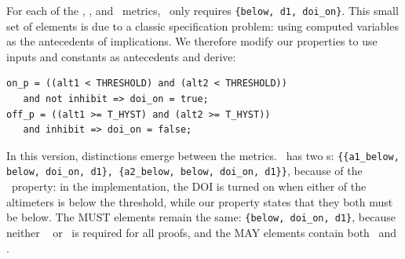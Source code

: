 \noindent %
For each of the \ivccov, \maycov, and \mustcov\ metrics, {\small \allp} ~only requires {\small \texttt{\{below, d1, doi\_on\}}}. %
This small set of elements is due to a classic specification problem: using computed variables as the antecedents of implications.  %
%
%
We therefore modify our properties to use inputs and constants as antecedents and derive:

{\smaller
\begin{verbatim}
on_p = ((alt1 < THRESHOLD) and (alt2 < THRESHOLD))
   and not inhibit => doi_on = true;
off_p = ((alt1 >= T_HYST) and (alt2 >= T_HYST))
   and inhibit => doi_on = false;
\end{verbatim}
}

\noindent In this version, distinctions emerge between the metrics.  {\small \allp } ~has two \mivc s: {\small{ \texttt{\{\{a1\_below, below, doi\_on, d1\}, \{a2\_below, below, doi\_on, d1\}\}}}},
because of the {\small { \onp }} ~property: in the implementation, the DOI is turned on when either of the altimeters is below the threshold, while our property states that they both must be below.
The MUST elements remain the same: {\small{ \texttt{\{below, doi\_on, d1\}}}}, because neither {\small \aonebelow }~ or {\small {\atwobelow}} ~is required for all proofs, and   %
the MAY elements contain both {\small \aonebelow } ~and {\small \atwobelow }.

